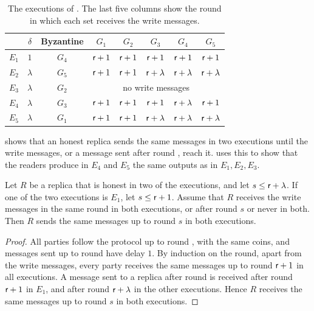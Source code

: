 \begin{table}[ht]
    \centering
    \caption{The executions of . The last five columns show the round in which each set receives the write messages.}
    \label{tab:lower-bound-executions}
    \setlength{\tabcolsep}{5pt}
    \renewcommand{\arraystretch}{1.15}
    \begin{tabular}{|c|c|c|c|c|c|c|c|}
        \hline
        & $\delta$ & Byzantine & $G_1$ & $G_2$ & $G_3$ & $G_4$ & $G_5$ \\
        \hline
        $E_1$ & $1$ & $G_4$ & $\textsf{r} + 1$ & $\textsf{r} + 1$ & $\textsf{r} + 1$ & $\textsf{r} + 1$ & $\textsf{r} + 1$ \\
        $E_2$ & $\lambda$ & $G_5$ & $\textsf{r} + 1$ & $\textsf{r} + 1$ & $\textsf{r} + \lambda$ & $\textsf{r} + \lambda$ & $\textsf{r} + \lambda$ \\
        $E_3$ & $\lambda$ & $G_2$ & \multicolumn{5}{c|}{no write messages} \\
        $E_4$ & $\lambda$ & $G_3$ & $\textsf{r} + 1$ & $\textsf{r} + 1$ & $\textsf{r} + 1$ & $\textsf{r} + \lambda$ & $\textsf{r} + 1$ \\
        $E_5$ & $\lambda$ & $G_1$ & $\textsf{r} + 1$ & $\textsf{r} + 1$ & $\textsf{r} + \lambda$ & $\textsf{r} + \lambda$ & $\textsf{r} + \lambda$ \\
        \hline
    \end{tabular}
\end{table}

 shows that an honest replica sends the same
messages in two executions until the write messages, or a message sent after
round \round, reach it.  uses this to show that
the readers produce in $E_4$ and $E_5$ the same outputs as in $E_1, E_2, E_3$.

\begin{lemma}\label{lem:lower-bound-replicas}
    Let $R$ be a replica that is honest in two of the executions, and let $s
    \leq \textsf{r} + \lambda$. If one of the two executions is $E_1$, let $s \leq
    \textsf{r} + 1$. Assume that $R$ receives the write messages in the same round
    in both executions, or after round $s$ or never in both. Then $R$ sends the
    same messages up to round $s$ in both executions.
\end{lemma}
\begin{proof}
    All parties follow the protocol up to round \round, with the same coins, and
    messages sent up to round \round have delay $1$. By induction on the round,
    apart from the write messages, every party receives the same messages up to
    round $\textsf{r} + 1$ in all executions. A message sent to a replica after
    round \round is received after round $\textsf{r} + 1$ in $E_1$, and after round
    $\textsf{r} + \lambda$ in the other executions. Hence $R$ receives the same
    messages up to round $s$ in both executions.
\end{proof}

